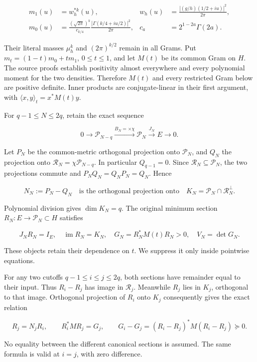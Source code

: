\documentclass{article}
\begin{document}
\[
\begin{aligned}
m_1(u)&=w_h^{*k}(u),&w_h(u)&=\frac{|(g/h)(1/2+iu)|^2}{2\pi},\\
m_0(u)&=\frac{(\sqrt{2\pi})^k}{c_{k/4}}
 \frac{|\Gamma(k/4+iu/2)|^2}{2\pi},&c_a&=2^{1-2a}\Gamma(2a).
\end{aligned}
\tag{AA2}
\]

Their literal masses \(\mu_h^k\) and \((2\pi)^{k/2}\) remain in all Grams. Put \(m_t=(1-t)m_0+tm_1\), \(0\le t\le1\), and let \(M(t)\) be its common Gram on \(H\). The source proofs establish positivity almost everywhere and every polynomial moment for the two densities. Therefore \(M(t)\) and every restricted Gram below are positive definite. Inner products are conjugate-linear in their first argument, with \(\langle x,y\rangle_t=x^*M(t)y\).

For \(q-1\le N\le2q\), retain the exact sequence

\[
0\to\mathcal P_{N-q}\xrightarrow{B_N=\times\chi}
\mathcal P_N\xrightarrow{J_N}E\to0.
\tag{AA3}
\]

Let \(P_N\) be the common-metric orthogonal projection onto \(\mathcal P_N\), and \(Q_N\) the projection onto \(\mathcal R_N=\chi\mathcal P_{N-q}\). In particular \(Q_{q-1}=0\). Since \(\mathcal R_N\subseteq\mathcal P_N\), the two projections commute and \(P_NQ_N=Q_NP_N=Q_N\). Hence

\[
N_N:=P_N-Q_N
\quad\text{is the orthogonal projection onto}\quad
K_N=\mathcal P_N\cap\mathcal R_N^\perp.
\tag{AA4}
\]

Polynomial division gives \(\dim K_N=q\). The original minimum section \(R_N:E\to\mathcal P_N\subset H\) satisfies

\[
J_NR_N=I_E,\quad\operatorname{im}R_N=K_N,
\quad G_N=R_N^*M(t)R_N>0,\quad V_N=\det G_N.
\tag{AA5}
\]

These objects retain their dependence on \(t\). We suppress it only inside pointwise equations.

For any two cutoffs \(q-1\le i\le j\le2q\), both sections have remainder equal to their input. Thus \(R_i-R_j\) has image in \(\mathcal R_j\). Meanwhile \(R_j\) lies in \(K_j\), orthogonal to that image. Orthogonal projection of \(R_i\) onto \(K_j\) consequently gives the exact relation

\[
R_j=N_jR_i,\qquad
R_i^*MR_j=G_j,
\qquad
G_i-G_j=(R_i-R_j)^*M(R_i-R_j)\succeq0.
\tag{AA6}
\]

No equality between the different canonical sections is assumed. The same formula is valid at \(i=j\), with zero difference.
\end{document}
